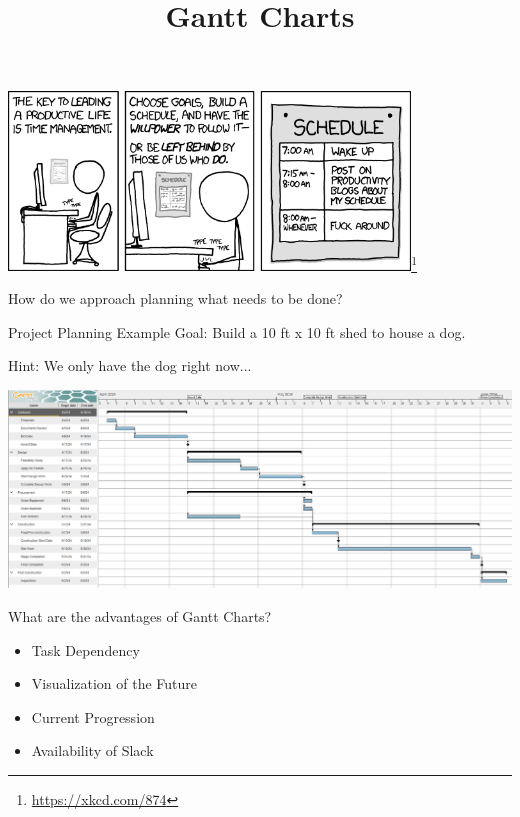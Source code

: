 \documentclass[aspectratio=169]{beamer}
\title{Gantt Charts}
\institute{Engineers for Exploration, UC San Diego}
\begin{document}
\maketitle
\begin{frame}
    \centering
    \includegraphics[width=0.8\textwidth]{xkcd_874_time_management.png}\footnote{\url{https://xkcd.com/874}}
\end{frame}
\begin{frame}
    How do we approach planning what needs to be done?
\end{frame}
\begin{frame}{Project Planning Example}
    Goal: Build a 10 ft x 10 ft shed to house a dog.

    Hint: We only have the dog right now...
\end{frame}
\begin{frame}
    \centering
    \includegraphics[width=\textwidth]{Construction-Gantt-chart-showing-task-lists-and-due-dates.png}
\end{frame}
\begin{frame}{What are the advantages of Gantt Charts?}
    \begin{itemize}
        \item Task Dependency
        \item Visualization of the Future
        \item Current Progression
        \item Availability of Slack
    \end{itemize}
\end{frame}
\end{document}
